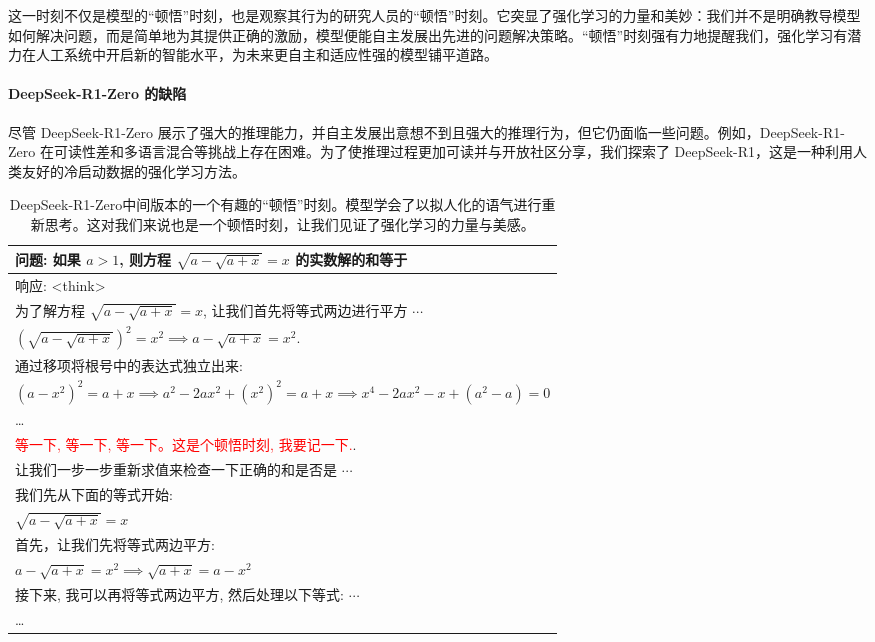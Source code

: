 \documentclass[lang=cn,a4paper,newtx]{elegantpaper}
\newcommand{\dsri}{DeepSeek-R1}
\newcommand{\dsro}{DeepSeek-R1-Zero}
\begin{document}
这一时刻不仅是模型的“顿悟”时刻，也是观察其行为的研究人员的“顿悟”时刻。它突显了强化学习的力量和美妙：我们并不是明确教导模型如何解决问题，而是简单地为其提供正确的激励，模型便能自主发展出先进的问题解决策略。“顿悟”时刻强有力地提醒我们，强化学习有潜力在人工系统中开启新的智能水平，为未来更自主和适应性强的模型铺平道路。

\paragraph{\dsro{} 的缺陷}

尽管 \dsro{} 展示了强大的推理能力，并自主发展出意想不到且强大的推理行为，但它仍面临一些问题。例如，\dsro{} 在可读性差和多语言混合等挑战上存在困难。为了使推理过程更加可读并与开放社区分享，我们探索了 \dsri{}，这是一种利用人类友好的冷启动数据的强化学习方法。

\begin{table}[t]
  \centering
  \begin{tabular}{l}
  \toprule 
  问题: 如果 \(a > 1\), 则方程 \(\sqrt{a - \sqrt{a + x}} = x\) 的实数解的和等于 \\
  \midrule
  响应: <think> \\
  为了解方程 \(\sqrt{a - \sqrt{a + x}} = x\), 让我们首先将等式两边进行平方 $\cdots$ \\
  $\left(\sqrt{a - \sqrt{a + x}}\right)^2 = x^2 \implies a - \sqrt{a + x} = x^2.$ \\
  通过移项将根号中的表达式独立出来: \\
  $(a - x^2)^2 = a + x \implies a^2 - 2ax^2 + (x^2)^2 = a + x \implies x^4 - 2ax^2 - x + (a^2 - a) = 0$ \\
  \ldots \\
  \textcolor{red}{等一下, 等一下, 等一下。这是个顿悟时刻, 我要记一下.}. \\
  让我们一步一步重新求值来检查一下正确的和是否是 $\cdots$ \\
  我们先从下面的等式开始: \\
  $\sqrt{a - \sqrt{a + x}} = x$ \\
  首先，让我们先将等式两边平方: \\
  $a - \sqrt{a + x} = x^2 \implies \sqrt{a + x} = a - x^2$ \\
  接下来, 我可以再将等式两边平方, 然后处理以下等式: 
  $\cdots$
  \\
  \ldots \\
  \hline
  \end{tabular}
  \caption{\dsro{}中间版本的一个有趣的“顿悟”时刻。模型学会了以拟人化的语气进行重新思考。这对我们来说也是一个顿悟时刻，让我们见证了强化学习的力量与美感。}
  \label{tab:aha_moment}
  \end{table}
\end{document}
